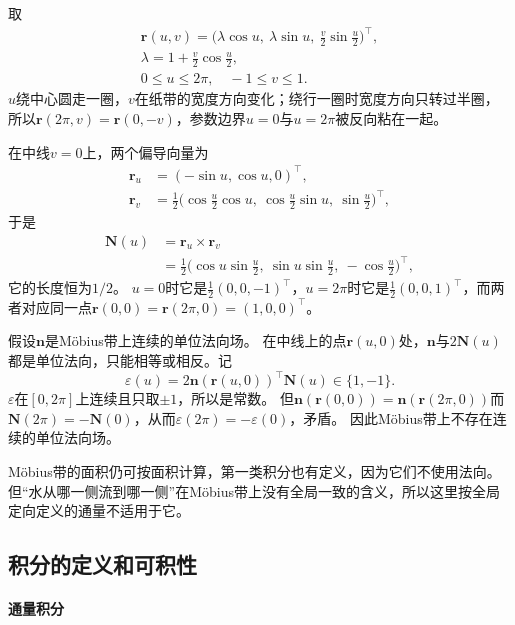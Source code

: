 \begin{example}[Möbius带上的法向绕行一圈后反向]
\label{ex:analysis-mobius-normal-reversal}
取
\[
 \begin{gathered}
 \bm r(u,v)=\bigl(\lambda\cos u,\ \lambda\sin u,\ \tfrac v2\sin\tfrac u2\bigr)^\top,\\
 \lambda=1+\tfrac v2\cos\tfrac u2,\\
 0\leq u\leq2\pi,\quad -1\leq v\leq1.
 \end{gathered}
\]
$u$绕中心圆走一圈，$v$在纸带的宽度方向变化；绕行一圈时宽度方向只转过半圈，所以$\bm r(2\pi,v)=\bm r(0,-v)$，参数边界$u=0$与$u=2\pi$被反向粘在一起。

在中线$v=0$上，两个偏导向量为
\[
 \begin{aligned}
 \bm r_u&=(-\sin u,\cos u,0)^\top,\\
 \bm r_v&=\tfrac12\bigl(\cos\tfrac u2\cos u,\ \cos\tfrac u2\sin u,\ \sin\tfrac u2\bigr)^\top,
 \end{aligned}
\]
于是
\[
 \begin{aligned}
 \bm N(u)&=\bm r_u\times\bm r_v\\
 &=\tfrac12\bigl(\cos u\sin\tfrac u2,\ \sin u\sin\tfrac u2,\ -\cos\tfrac u2\bigr)^\top,
 \end{aligned}
\]
它的长度恒为$1/2$。
$u=0$时它是$\frac12(0,0,-1)^\top$，$u=2\pi$时它是$\frac12(0,0,1)^\top$，而两者对应同一点$\bm r(0,0)=\bm r(2\pi,0)=(1,0,0)^\top$。

假设$\bm n$是Möbius带上连续的单位法向场。
在中线上的点$\bm r(u,0)$处，$\bm n$与$2\bm N(u)$都是单位法向，只能相等或相反。记
\[
 \varepsilon(u)=2\bm n(\bm r(u,0))^\top\bm N(u)\in\{1,-1\}.
\]
$\varepsilon$在$[0,2\pi]$上连续且只取$\pm1$，所以是常数。
但$\bm n(\bm r(0,0))=\bm n(\bm r(2\pi,0))$而$\bm N(2\pi)=-\bm N(0)$，从而$\varepsilon(2\pi)=-\varepsilon(0)$，矛盾。
因此Möbius带上不存在连续的单位法向场。
\end{example}

Möbius带的面积仍可按面积计算，第一类积分也有定义，因为它们不使用法向。
但“水从哪一侧流到哪一侧”在Möbius带上没有全局一致的含义，所以这里按全局定向定义的通量不适用于它。

\subsection{积分的定义和可积性}

\paragraph{通量积分}

